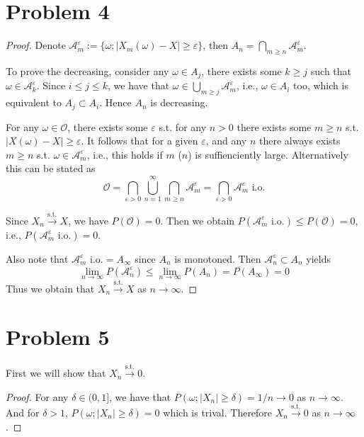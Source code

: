 \documentclass{homework}
\begin{document}
    \section{Problem 4}
    \begin{proof}
        Denote $\mathcal A_m^\varepsilon:=\{\omega;|X_m(\omega)-X|\geq\varepsilon\}$,
        then $A_n=\bigcap_{m\geq n}\mathcal A_m^\varepsilon$.

        To prove the decreasing, consider any $\omega\in A_j$,
        there exists some $k\geq j$ such that $\omega\in\mathcal A_k^\varepsilon$.
        Since $i\leq j\leq k$, we have that $\omega\in\bigcup_{m\geq j}\mathcal A_m^\varepsilon$,
        i.e., $\omega\in A_i$ too, which is equivalent to $A_j\subset A_i$. Hence
        $A_n$ is decreasing.

        For any $\omega\in\mathcal O$, there exists some $\varepsilon$ s.t.
        for any $n>0$ there exists some $m\geq n$ s.t. $|X(\omega)-X|\geq\varepsilon$.
        It follows that for a given $\varepsilon$, and any $n$ there always
        exists $m\geq n$ s.t. $\omega\in\mathcal A_m^\varepsilon$, i.e.,
        this holds if $m$ ($n$) is suffienciently large.
        Alternatively this can be stated as
        \[\mathcal O=\bigcap_{\varepsilon>0}\bigcup_{n=1}^\infty
        \bigcap_{m\geq n}\mathcal A_m^\varepsilon
        =\bigcap_{\varepsilon>0}\mathcal A_m^\varepsilon\text{ i.o.}\]

        Since $X_n\xrightarrow{\mathrm{s.t.}}X$, we have $P(\mathcal O)=0$.
        Then we obtain $P(\mathcal A_m^\varepsilon\text{ i.o.})\leq
        P(\mathcal{O})=0$, i.e., $P(\mathcal A_m^\varepsilon\text{ i.o.})=0$.
        
        Also note that $\mathcal A_m^\varepsilon\text{ i.o.}=A_\infty$ since
        $A_n$ is monotoned. Then $\mathcal A_n^\varepsilon
        \subset A_n$ yields
        \[\lim_{n\to\infty}P(\mathcal A_n^\varepsilon)
        \leq\lim_{n\to\infty}P(A_n)=P(A_\infty)=0\]
        Thus we obtain that $X_n\xrightarrow{\mathrm{s.t.}}X$ as
        $n\to\infty$.
    \end{proof}

    \section{Problem 5}
    First we will show that $X_n\xrightarrow{\mathrm{s.t.}}0$.
    \begin{proof}
        For any $\delta\in(0,1]$, we have that $P(\omega;|X_n|\geq\delta)
        =1/n\to 0$ as $n\to\infty$. And for $\delta>1$, $P(\omega;|X_n|\geq\delta)
        =0$ which is trival. Therefore $X_n\xrightarrow{\mathrm{s.t.}}0$ as
        $n\to\infty$.
    \end{proof}
\end{document}
